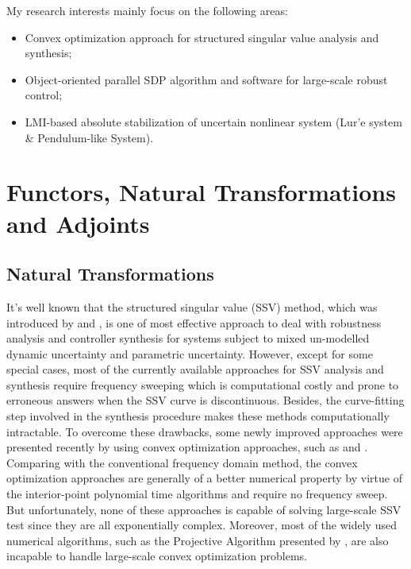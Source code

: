 \documentclass{article}
\begin{document}
My research interests mainly focus on the following areas:
\begin{itemize}
\item
Convex optimization approach for structured singular value analysis and synthesis;
\item
Object-oriented parallel SDP algorithm and software for large-scale robust control;
\item
LMI-based absolute stabilization of uncertain nonlinear system (Lur'e system \& Pendulum-like System).
\end{itemize}

\section{Functors, Natural Transformations and Adjoints}
\subsection{Natural Transformations}
It's well known that the structured singular value (SSV) method,
which was introduced by {\citet{Doyle82A}} and {\citet{Safonov82}},
is one of most effective approach to deal with robustness analysis and controller synthesis for systems
subject to mixed un-modelled dynamic uncertainty and parametric uncertainty.
However, except for some special cases, most of the currently available approaches for SSV analysis and synthesis require
frequency sweeping which is computational costly and prone to erroneous answers
when the SSV curve is discontinuous.
Besides, the curve-fitting step involved in the synthesis procedure makes these methods computationally intractable.
To overcome these drawbacks, some newly improved approaches were presented recently by using convex optimization approaches,
such as {\citep{FuB95A}} and {\citep{ChenS98A}}.
Comparing with the conventional frequency domain method,
the convex optimization approaches are generally of a better numerical property
by virtue of the interior-point polynomial time algorithms{\citep{NN94}} and require no frequency sweep.
But unfortunately, none of these approaches is capable of solving large-scale SSV test
since they are all exponentially complex.
Moreover, most of the widely used numerical algorithms,
such as the Projective Algorithm presented by {\citet{Projective}},
are also incapable to handle large-scale convex optimization problems.
\end{document}
